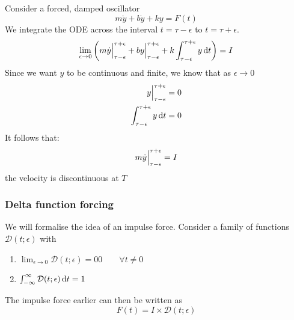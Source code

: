 \documentclass{article}
\begin{document}
Consider a forced, damped oscillator
\[
    m \ddot{y} + b \dot{y} + ky = F(t)
\]
We integrate the ODE across the interval $t = \tau - \epsilon$ to $t = \tau + \epsilon$.
\[
    \lim_{\epsilon \rightarrow 0} \left(  m \dot{y} \Big{|}_{\tau - \epsilon}^{\tau + \epsilon} + b y\Big{|}_{\tau - \epsilon}^{\tau + \epsilon} + k \int_{\tau - \epsilon}^{\tau + \epsilon} y \mathop{}\!\mathrm{d} t  \right) = I    
\]
Since we want $y$ to be continuous and finite, we know that as $\epsilon \rightarrow 0$
\begin{align*}
    y\Big{|}_{\tau - \epsilon}^{\tau + \epsilon} = 0 \\
    \int_{\tau - \epsilon}^{\tau + \epsilon} y \mathop{}\!\mathrm{d} t = 0
\end{align*}
It follows that:
\[
    m \dot{y} \Big{|}_{\tau - \epsilon}^{\tau + \epsilon} = I
\]
the velocity is discontinuous at $T$
\subsubsection{Delta function forcing}
We will formalise the idea of an impulse force. Consider a family of functions $\mathcal{D}(t; \epsilon)$ with 
\begin{enumerate}[label=\arabic*.]
    \item $\lim_{\epsilon \rightarrow 0} \mathcal{D}(t; \epsilon) = 0 0 \qquad \forall t \neq 0$
    \item $\int_{-\infty}^{\infty}{\mathcal{D}(t; \epsilon) \mathop{}\!\mathrm{d} t} = 1$
\end{enumerate}
The impulse force earlier can then be written as
\[
    F(t) = I \times \mathcal{D}(t; \epsilon)  
\]
\end{document}

